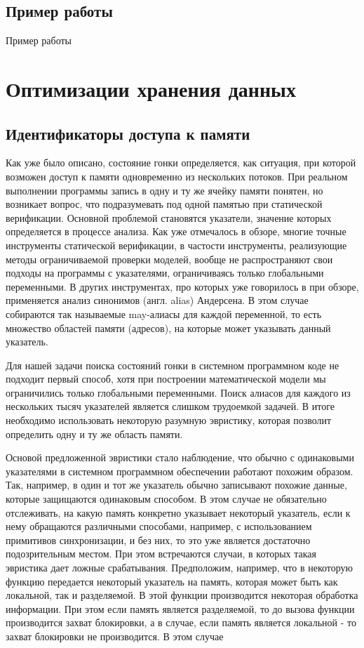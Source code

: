 \subsection{Пример работы} \label{sect_impl_example}
Пример работы 

\section{Оптимизации хранения данных} \label{sect_impl_storage}


\subsection{Идентификаторы доступа к памяти} \label{subsect_impl_identifiers}

Как уже было описано, состояние гонки определяется, как ситуация, при которой возможен доступ к памяти одновременно из нескольких потоков. 
При реальном выполнении программы запись в одну и ту же ячейку памяти понятен, но возникает вопрос, что подразумевать под одной памятью при статической верификации.
Основной проблемой становятся указатели, значение которых определяется в процессе анализа.
Как уже отмечалось в обзоре, многие точные инструменты статической верификации, в частости инструменты, реализующие методы ограничиваемой проверки моделей, вообще не распространяют свои подходы на программы с указателями, ограничиваясь только глобальными переменными.
В других инструментах, про которых уже говорилось в при обзоре, применяется анализ синонимов (англ. alias) Андерсена.
В этом случае собираются так называемые may-алиасы для каждой переменной, то есть множество областей памяти (адресов), на которые может указывать данный указатель.

Для нашей задачи поиска состояний гонки в системном программном коде не подходит первый способ, хотя при построении математической модели мы ограничились только глобальными переменными.
Поиск алиасов для каждого из нескольких тысяч указателей является слишком трудоемкой задачей.
В итоге необходимо использовать некоторую разумную эвристику, которая позволит определить одну и ту же область памяти. 

Основой предложенной эвристики стало наблюдение, что обычно с одинаковыми указателями в системном программном обеспечении работают похожим образом.
Так, например, в один и тот же указатель обычно записывают похожие данные, которые защищаются одинаковым способом.
В этом случае не обязательно отслеживать, на какую память конкретно указывает некоторый указатель, если к нему обращаются различными способами, например, с использованием примитивов синхронизации, и без них, то это уже является достаточно подозрительным местом.
При этом встречаются случаи, в которых такая эвристика дает ложные срабатывания. 
Предположим, например, что в некоторую функцию передается некоторый указатель на память, которая может быть как локальной, так и разделяемой. 
В этой функции производится некоторая обработка информации. При этом если память является разделяемой, то до вызова функции производится захват блокировки, а в случае, если память является локальной - то захват блокировки не производится.
В этом случае 

